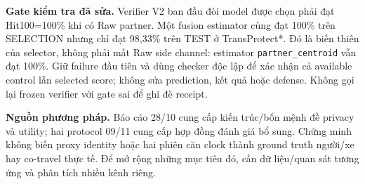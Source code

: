 \documentclass[10pt,a4paper]{article}
\begin{document}
\textbf{Gate kiểm tra đã sửa.} Verifier V2 ban đầu đòi model được chọn phải đạt Hit100=100\% khi có Raw
partner. Một fusion estimator cùng đạt 100\% trên SELECTION nhưng chỉ đạt 98,33\% trên TEST ở TransProtect*.
Đó là biến thiên của selector, không phải mất Raw side channel: estimator \texttt{partner\_centroid} vẫn đạt
100\%. Giữ failure đầu tiên và dùng checker độc lập để xác nhận cả available control lẫn selected score;
không sửa prediction, kết quả hoặc defense. Không gọi lại frozen verifier với gate sai để ghi đè receipt.

\textbf{Nguồn phương pháp.} Báo cáo 28/10 cung cấp kiến trúc/bốn mệnh đề privacy và utility;
hai protocol 09/11 cung cấp hợp đồng đánh giá bổ sung. Chứng minh không biến proxy identity hoặc
hai phiên căn clock thành ground truth người/xe hay co-travel thực tế. Để mở rộng những mục tiêu đó,
cần dữ liệu/quan sát tương ứng và phân tích nhiều kênh riêng.
\end{document}
